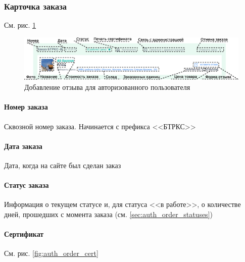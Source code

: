             \subsubsection{Карточка заказа}

                См. рис. \ref{fig:auth_order_cart}

                \begin{figure}
                    \center
                    \includegraphics[width=170mm]{04_auth_funcs/figures/12.eps}
                    \caption{Добавление отзыва для авторизованного пользователя}
                    \label{fig:auth_order_cart}
                \end{figure}

                \paragraph{Номер заказа}
                    Сквозной номер заказа. Начинается с префикса <<БТРКС>>

                \paragraph{Дата заказа}
                    Дата, когда на сайте  был сделан заказ

                \paragraph{Статус заказа}
                    Информация о текущем статусе и, для статуса <<в 
                    работе>>, о количестве дней, прошедших с момента заказа 
                    (см. \ref{sec:auth_order_statuses})

                \paragraph{Сертификат}
                См. рис. \ref{fig:auth_order_cert}

